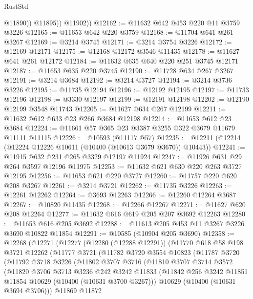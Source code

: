 \begin{lexlean}{RustStd}
\begin{coremodule}
{\begin{coremodule}
{{{{{{{{{{{{{{{{{{{{{{{{{                @11890))
            @11895))
        @11902))
@12162 := @11632 @642 @453 @220 @11 @3759 @3226
@12165 := @11653 @642 @220 @3759
@12168 := @11704 @641 @261 @3267
@12169 := @3214 @3745
@12171 := @3214 @3754 @3226
@12172 := @12169 @12171
@12175 := @12168 @12172 @3546 @11435
@12178 := @11627 @641 @261 @12172
@12184 := @11632 @635 @640 @220 @251 @3745 @12171
@12187 := @11653 @635 @220 @3745
@12190 := @11728 @634 @267 @3267
@12191 := @3214 @3684
@12192 := @3214 @3727
@12194 := @3214 @3736 @3226
@12195 := @11735 @12194
@12196 := @12192 @12195
@12197 := @11733 @12196
@12198 := @3330 @12197
@12199 := @12191 @12198
@12202 := @12190 @12199 @3548 @11743
@12205 := @11627 @634 @267 @12199
@12211 := @11632 @612 @633 @23 @266 @3684 @12198
@12214 := @11653 @612 @23 @3684
@12224 := @11661 @57 @365 @23 @3387 @3255 @322 @3679 @11679 @11111 @11115
@12226 := @10593 (@11117 @57)
@12235 := @12211 (@12214 (@12224 @12226 @10611 (@10400 (@10613 @3679 @3670)) @10443))
@12241 := @11915 @632 @231 @265 @3329 @12197 @11924
@12247 := @11926 @631 @29 @264 @3597 @12196 @11975
@12253 := @11632 @621 @630 @220 @263 @3727 @12195
@12256 := @11653 @621 @220 @3727
@12260 := @11757 @220 @620 @208 @3267
@12261 := @3214 @3721
@12262 := @11735 @3226
@12263 := @12261 @12262
@12264 := @3693 @12263
@12266 := @12260 @12264 @3687
@12267 := @10820 @11435
@12268 := @12266 @12267
@12271 := @11627 @620 @208 @12264
@12277 := @11632 @616 @619 @205 @207 @3692 @12263
@12280 := @11653 @616 @205 @3692
@12288 := @11613 @205 @453 @11 @3267 @3226 @3690 @10822 @11854
@12291 := @10585 (@10904 @205 @3690)
@12358 := @12268
    (@12271
      (@12277
        (@12280 (@12288 @12291))
        (@11770
          @618
          @58
          @198
          @3721
          @12262
          (@11777
            @3721
            (@11782
              @3720
              @3554
              @10823
              (@11787
                @3720
                (@11792
                  @3718
                  @3226
                  (@11802
                    @3707
                    @3716
                    (@11810
                      @3707
                      @3714
                      @3572
                      (@11820
                        @3706
                        @3713
                        @3236
                        @242
                        @3242
                        @11833
                        (@11842 @256 @3242 @11851 @11854 @10629 (@10400 (@10631 @3700 @3267)))
                        @10629
                        (@10400 (@10631 @3694 @3706)))
                      @11869
                      @11872
}}}}}}}}}}}}}}}}}}}}}}}}}
\end{coremodule}}
\end{coremodule}
\end{lexlean}
